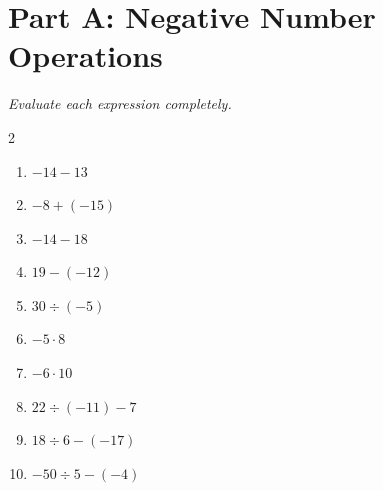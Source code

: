 \documentclass[11pt]{article}
\begin{document}
\section*{Part A: Negative Number Operations}
\noindent\textit{Evaluate each expression completely.}
\begin{multicols}{2}
\begin{enumerate}
  \item $-14 - 13$
  \vspace{1.1cm}
  \item $-8 + (-15)$
  \vspace{1.1cm}
  \item $-14 - 18$
  \vspace{1.1cm}
  \item $19 - (-12)$
  \vspace{1.1cm}
  \item $30 \div (-5)$
  \vspace{1.1cm}
  \item $-5 \cdot 8$
  \vspace{1.1cm}
  \item $-6 \cdot 10$
  \vspace{1.1cm}
  \item $22 \div (-11) - 7$
  \vspace{1.1cm}
  \item $18 \div 6 - (-17)$
  \vspace{1.1cm}
  \item $-50 \div 5 - (-4)$
  \vspace{1.1cm}
\end{enumerate}
\end{multicols}
\end{document}
